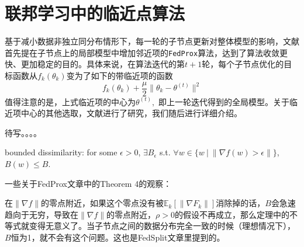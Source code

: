 \section{联邦学习中的临近点算法}
\label{sec:chap2-ppa}

基于减小数据非独立同分布情形下，每一轮的子节点更新对整体模型的影响，文献\parencite{sahu2018fedprox}首先提在子节点上的局部模型中增加邻近项的\texttt{FedProx}算法，达到了算法收敛更快、更加稳定的目的。具体来说，在算法迭代的第$t+1$轮，每个子节点优化的目标函数从$f_k(\theta_k)$变为了如下的带临近项的函数
\begin{equation}
\label{eq:fedprox}
f_k(\theta_k) + \frac{\mu}{2} \lVert \theta_k - \theta^{(t)} \rVert^2
\end{equation}
值得注意的是，上式临近项的中心为$\theta^{(t)},$ 即上一轮迭代得到的全局模型。关于临近项中心的其他选取，文献\parencite{hanzely2020federated,li_2021_ditto}进行了研究，我们随后进行详细介绍。

待写。。。。


bounded dissimilarity:
for some $\epsilon > 0$, $\exists B_{\epsilon}$ s.t. $\forall w \in \{ w ~|~ \lVert \nabla f(w) > \epsilon \rVert \}$, $B(w) \leqslant B$.

一些关于FedProx文章中的Theorem 4的观察：

在$\lVert \nabla f \rVert$的零点附近，如果这个零点没有被$\mathbb{E}_k[\lVert \nabla F_k \rVert]$消除掉的话，$B$会急速趋向于无穷，导致在$\lVert \nabla f \rVert$的零点附近，$\rho > 0$的假设不再成立，那么定理中的不等式就变得无意义了。当子节点之间的数据分布完全一致的时候（理想情况下），$B$恒为1，就不会有这个问题。这也是FedSplit\cite{pathak2020fedsplit}文章里提到的。
